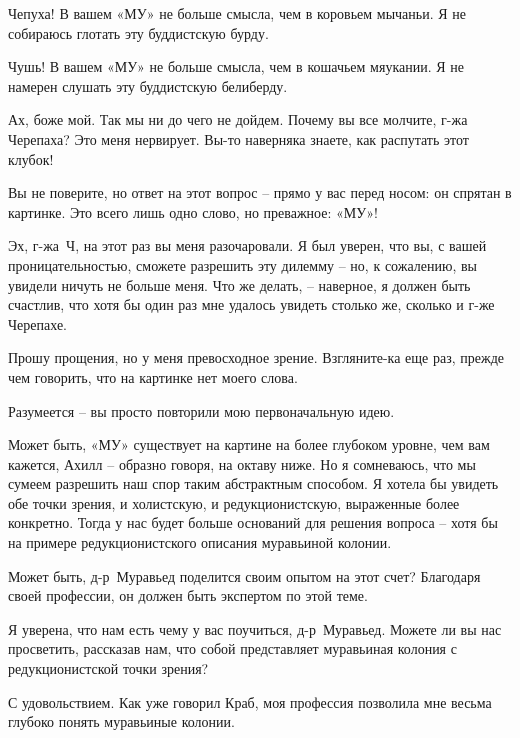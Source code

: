\documentclass[../main.tex]{subfiles}
\begin{document}
\begin{dialogue}
 Чепуха! В вашем «МУ» не больше смысла, чем в коровьем мычаньи. Я не собираюсь глотать эту буддистскую бурду.

 Чушь! В вашем «МУ» не больше смысла, чем в кошачьем мяукании. Я не намерен слушать эту буддистскую белиберду.

 Ах, боже мой. Так мы ни до чего не дойдем. Почему вы все молчите, г-жа Черепаха? Это меня нервирует. Вы-то наверняка знаете, как распутать этот клубок!

 Вы не поверите, но ответ на этот вопрос \--- прямо у вас перед носом: он спрятан в картинке. Это всего лишь одно слово, но преважное: «МУ»!


 Эх, г-жа~Ч, на этот раз вы меня разочаровали. Я был уверен, что вы, с вашей проницательностью, сможете разрешить эту дилемму \--- но, к сожалению, вы увидели ничуть не больше меня. Что же делать, \--- наверное, я должен быть счастлив, что хотя бы один раз мне удалось увидеть столько же, сколько и г-же Черепахе.

 Прошу прощения, но у меня превосходное зрение. Взгляните-ка еще раз, прежде чем говорить, что на картинке нет моего слова.

 Разумеется \--- вы просто повторили мою первоначальную идею.

 Может быть, «МУ» существует на картине на более глубоком уровне, чем вам кажется, Ахилл \--- образно говоря, на октаву ниже. Но я сомневаюсь, что мы сумеем разрешить наш спор таким абстрактным способом. Я хотела бы увидеть обе точки зрения, и холистскую, и редукционистскую, выраженные более конкретно. Тогда у нас будет больше оснований для решения вопроса \--- хотя бы на примере редукционистского описания муравьиной колонии.

 Может быть, д-р~Муравьед поделится своим опытом на этот счет? Благодаря своей профессии, он должен быть экспертом по этой теме.

 Я уверена, что нам есть чему у вас поучиться, д-р~Муравьед. Можете ли вы нас просветить, рассказав нам, что собой представляет муравьиная колония с редукционистской точки зрения?

 С удовольствием. Как уже говорил Краб, моя профессия позволила мне весьма глубоко понять муравьиные колонии.


\end{dialogue}
\end{document}
